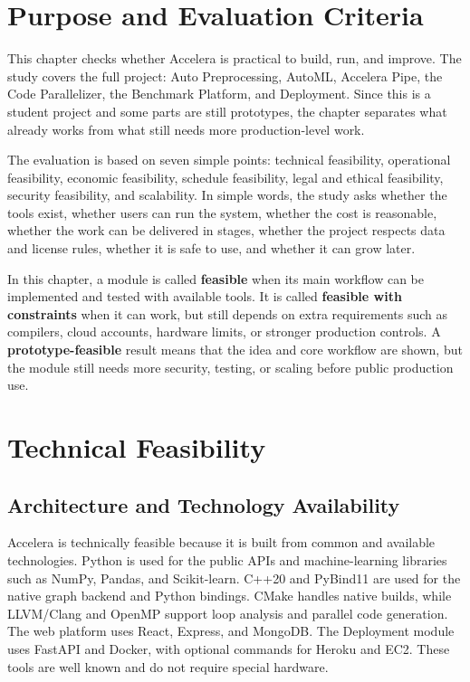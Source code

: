 \documentclass[12pt,a4paper]{report}
\begin{document}
\section{Purpose and Evaluation Criteria}
This chapter checks whether Accelera is practical to build, run, and improve.
The study covers the full project: Auto Preprocessing, AutoML, Accelera Pipe,
the Code Parallelizer, the Benchmark Platform, and Deployment. Since this is a
student project and some parts are still prototypes, the chapter separates what
already works from what still needs more production-level work.

The evaluation is based on seven simple points: technical feasibility,
operational feasibility, economic feasibility, schedule feasibility, legal and
ethical feasibility, security feasibility, and scalability. In simple words, the
study asks whether the tools exist, whether users can run the system, whether
the cost is reasonable, whether the work can be delivered in stages, whether the
project respects data and license rules, whether it is safe to use, and whether
it can grow later.

In this chapter, a module is called \textbf{feasible} when its main workflow can
be implemented and tested with available tools. It is called \textbf{feasible
with constraints} when it can work, but still depends on extra requirements such
as compilers, cloud accounts, hardware limits, or stronger production controls.
A \textbf{prototype-feasible} result means that the idea and core workflow are
shown, but the module still needs more security, testing, or scaling before
public production use.

\section{Technical Feasibility}
\subsection{Architecture and Technology Availability}
Accelera is technically feasible because it is built from common and available
technologies. Python is used for the public APIs and machine-learning libraries
such as NumPy, Pandas, and Scikit-learn. C++20 and PyBind11 are used for the
native graph backend and Python bindings. CMake handles native builds, while
LLVM/Clang and OpenMP support loop analysis and parallel code generation. The
web platform uses React, Express, and MongoDB. The Deployment module uses
FastAPI and Docker, with optional commands for Heroku and EC2. These tools are
well known and do not require special hardware.
\end{document}
